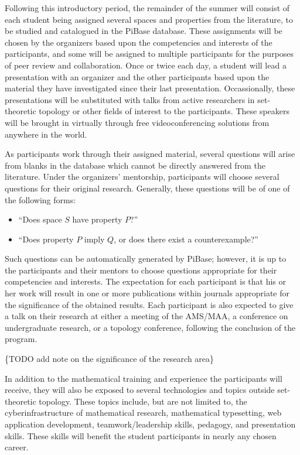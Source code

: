   Following this introductory period, the remainder of the summer will
  consist of each student being assigned several spaces and properties
  from the literature,
  to be studied and catalogued in the PiBase database. These assignments
  will be chosen by the organizers
  based upon the competencies and interests of the participants, and some
  will be assigned to multiple participants for the purposes of peer review
  and collaboration. Once or twice each day,
  a student will lead a presentation with an
  organizer and the other participants based upon the material they have
  investigated since their last presentation. Occassionally, these presentations
  will be substituted with talks from active researchers in set-theoretic topology
  or other fields of interest to the participants. These speakers will
  be brought in virtually through free
  videoconferencing solutions from anywhere in the world.

  As participants work through their assigned material, several questions will
  arise from blanks in the database which cannot be directly
  answered from the literature.
  Under the organizers' mentorship, participants will choose several questions
  for their original research. Generally, these questions will be of one of the
  following forms:
  \begin{itemize}
    \item ``Does space \(S\) have property \(P\)?''
    \item ``Does property \(P\) imply \(Q\), or does there exist a counterexample?''
  \end{itemize}
  Such questions can be automatically generated by PiBase; however, it is up
  to the participants and their mentors to choose questions appropriate for
  their competencies and interests. The expectation for each participant
  is that his or her work will result in one or more publications within
  journals appropriate for the significance of the obtained results. Each
  participant is also expected to give a talk on their research
  at either a meeting of the AMS/MAA, a conference on undergraduate research,
  or a topology conference, following the conclusion of the program.

  \{TODO add note on the significance of the research area\}

  In addition to the mathematical training and experience the participants will
  receive, they will also be exposed to several technologies and topics outside
  set-theoretic topology. These topics include, but are not limited to,
  the cyberinfrastructure of mathematical research, mathematical typesetting,
  web application development, teamwork/leadership skills, pedagogy,
  and presentation skills. These skills will benefit the student participants
  in nearly any chosen career.

